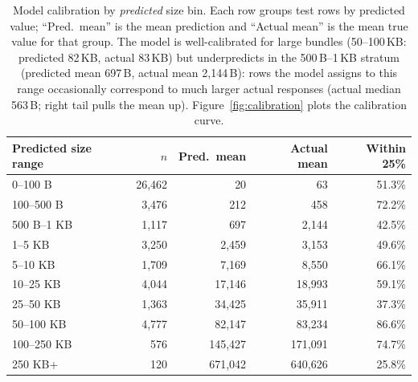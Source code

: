 \documentclass[sigconf,nonacm]{acmart}
\begin{document}
\begin{table}[t]
\centering
\small
\begin{tabular}{lrrrr}
\toprule
Predicted size range & $n$ & Pred.\ mean & Actual mean & Within 25\% \\
\midrule
0--100 B     &  26,462 &       20 &        63   &  51.3\% \\
100--500 B   &   3,476 &      212 &       458   &  72.2\% \\
500 B--1 KB  &   1,117 &      697 &     2,144   &  42.5\% \\
1--5 KB      &   3,250 &    2,459 &     3,153   &  49.6\% \\
5--10 KB     &   1,709 &    7,169 &     8,550   &  66.1\% \\
10--25 KB    &   4,044 &   17,146 &    18,993   &  59.1\% \\
25--50 KB    &   1,363 &   34,425 &    35,911   &  37.3\% \\
50--100 KB   &   4,777 &   82,147 &    83,234   &  86.6\% \\
100--250 KB  &     576 &  145,427 &   171,091   &  74.7\% \\
250 KB+      &     120 &  671,042 &   640,626   &  25.8\% \\
\bottomrule
\end{tabular}
\caption{Model calibration by \emph{predicted} size bin. Each row groups test rows by predicted value; ``Pred.\ mean'' is the mean prediction and ``Actual mean'' is the mean true value for that group. The model is well-calibrated for large bundles (50--100\,KB: predicted 82\,KB, actual 83\,KB) but underpredicts in the 500\,B--1\,KB stratum (predicted mean 697\,B, actual mean 2,144\,B): rows the model assigns to this range occasionally correspond to much larger actual responses (actual median 563\,B; right tail pulls the mean up). Figure~\ref{fig:calibration} plots the calibration curve.}
\label{tab:calibration}
\end{table}
\end{document}
